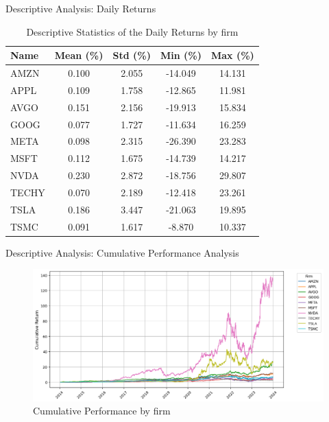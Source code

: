 \documentclass{beamer}
\begin{document}
\begin{frame}{Descriptive Analysis: Daily Returns}
  
\begin{table}[ht]
    \centering
    \begin{tabular}{lcccc}
        \toprule
        \textbf{Name} & \textbf{Mean (\%)} & \textbf{Std (\%)} & \textbf{Min (\%)} & \textbf{Max (\%)} \\
        \midrule
        AMZN  & 0.100 & 2.055 & -14.049 & 14.131 \\
        APPL  & 0.109 & 1.758 & -12.865 & 11.981 \\
        AVGO  & 0.151 & 2.156 & -19.913 & 15.834 \\
        GOOG  & 0.077 & 1.727 & -11.634 & 16.259 \\
        META  & 0.098 & 2.315 & -26.390 & 23.283 \\
        MSFT  & 0.112 & 1.675 & -14.739 & 14.217 \\
        NVDA  & 0.230 & 2.872 & -18.756 & 29.807 \\
        TECHY & 0.070 & 2.189 & -12.418 & 23.261 \\
        TSLA  & 0.186 & 3.447 & -21.063 & 19.895 \\
        TSMC  & 0.091 & 1.617 & -8.870  & 10.337 \\
        \bottomrule
    \end{tabular}
    \caption{Descriptive Statistics of the Daily Returns  by firm}
    \label{tab:returns_stats}
\end{table}
    
\end{frame}

\begin{frame}{Descriptive Analysis: Cumulative Performance Analysis}
  
\begin{figure}
    \centering
    \includegraphics[width=0.9\linewidth]{cum_perf_analysis.png}
    \caption{Cumulative Performance by firm}
    \label{fig:cum_perf}
\end{figure}
    
\end{frame}
\end{document}
